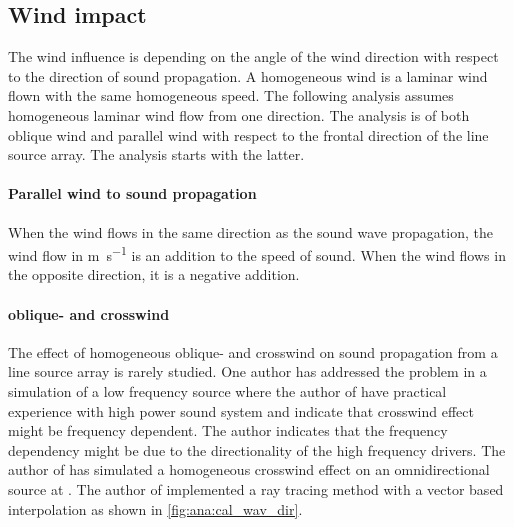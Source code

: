 \subsection{Wind impact}
The wind influence is depending on the angle of the wind direction with respect to the direction of sound propagation. A homogeneous wind is a laminar wind flown with the same homogeneous speed. The following analysis assumes homogeneous laminar wind flow from one direction. The analysis is of both oblique wind and parallel wind with respect to the frontal direction of the line source array. The analysis starts with the latter. 

\paragraph{Parallel wind to sound propagation} When the wind flows in the same direction as the sound wave propagation, the wind flow in \si{\meter\per\second} is an addition to the speed of sound. When the wind flows in the opposite direction, it is a negative addition.  


\paragraph{oblique- and crosswind} The effect of homogeneous oblique- and crosswind on sound propagation from a line source array is rarely studied. One author has addressed the problem in a simulation of a low frequency source \citep{crosswind_simulation} where the author of  \citep{BALLOU2008xi} have practical experience with high power sound system and indicate that crosswind effect might be frequency dependent.   The author indicates that the frequency dependency might be due to the directionality of the high frequency drivers. The author of \citep{crosswind_simulation} has simulated a homogeneous crosswind effect on an omnidirectional source at . The author of \citep{ray_tracing} implemented a ray tracing method with a vector based interpolation as shown in \autoref{fig:ana:cal_wav_dir}.



\startexplain
{}
\stopexplain

